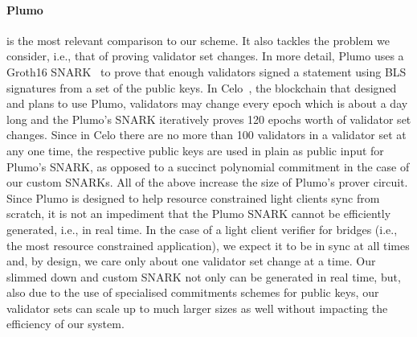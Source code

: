 
\noindent \paragraph{Plumo~\cite{plumo}} is the most relevant comparison to our scheme. It also tackles the problem we consider, i.e., that of
proving validator set changes. In more detail, Plumo uses a Groth16 SNARK~\cite{groth16} to prove that enough validators signed
a statement using BLS signatures from a set of the public keys. In Celo~\cite{celo}, the blockchain that designed and plans to use
Plumo, validators may change every epoch which is about a day long and the Plumo's SNARK iteratively proves 120 epochs worth of
validator set changes. Since in Celo there are no more than 100 validators in a validator set at any one time, the respective public
keys are used in plain as public input for Plumo's SNARK, as opposed to a succinct polynomial commitment in the case of our custom SNARKs.
All of the above increase the size of Plumo's prover circuit. Since Plumo is designed to help resource constrained light clients sync from scratch,
it is not an impediment that the Plumo SNARK cannot be efficiently generated, i.e., in real time. In the case of a light client verifier for bridges
(i.e., the most resource constrained application), we expect it to be in sync at all times and, by design, we care only about one validator
set change at a time. Our slimmed down and custom SNARK not only can be generated in real time, but, also due to the use of specialised
commitments schemes for public keys, our validator sets can scale up to much larger sizes as well without impacting the efficiency of our system.


